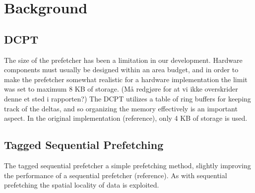 \section{Background}

\subsection*{DCPT}

The size of the prefetcher has been a limitation in our development. Hardware
components must usually be designed within an area budget, and in order to make
the prefetcher somewhat realistic for a hardware implementation the limit was
set to maximum 8 KB of storage. (Må redgjøre for at vi ikke overskrider denne et
sted i rapporten?) The DCPT utilizes a table of ring buffers for keeping track
of the deltas, and so organizing the memory effectively is an important aspect.
In the original implementation (reference), only 4 KB of storage is used.

\subsection*{Tagged Sequential Prefetching}

The tagged sequential prefetcher a simple prefetching method, slightly improving
the performance of a sequential prefetcher (reference). As with sequential
prefetching the spatial locality of data is exploited.


